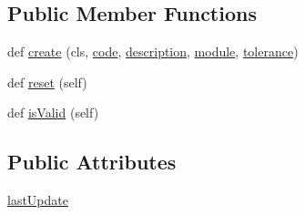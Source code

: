 \subsection*{Public Member Functions}
\begin{DoxyCompactItemize}
\item 
def \hyperlink{class_ground_segment_1_1models_1_1_watchdog_1_1_watchdog_a063f49fcc21dbb4f861c2e6e291cc1bb}{create} (cls, \hyperlink{class_ground_segment_1_1models_1_1_watchdog_1_1_watchdog_a9548413d6e37739ac54bdaa3a75d66f4}{code}, \hyperlink{class_ground_segment_1_1models_1_1_watchdog_1_1_watchdog_ab6bf4dee4015f39a9c62850ee3ca830e}{description}, \hyperlink{class_ground_segment_1_1models_1_1_watchdog_1_1_watchdog_ad2304bdf1d4275622b13386e224550a3}{module}, \hyperlink{class_ground_segment_1_1models_1_1_watchdog_1_1_watchdog_abb2ac1834f5367e279b537108087a4f8}{tolerance})
\item 
def \hyperlink{class_ground_segment_1_1models_1_1_watchdog_1_1_watchdog_aadb34213f1de7bec981332ca73decf2c}{reset} (self)
\item 
def \hyperlink{class_ground_segment_1_1models_1_1_watchdog_1_1_watchdog_a7e69e83c40e41bed9e6f2aa44d18b47d}{is\+Valid} (self)
\end{DoxyCompactItemize}
\subsection*{Public Attributes}
\begin{DoxyCompactItemize}
\item 
\hyperlink{class_ground_segment_1_1models_1_1_watchdog_1_1_watchdog_a1c3ed2ac40ff216074da715ad3f5eb8a}{last\+Update}
\end{DoxyCompactItemize}

